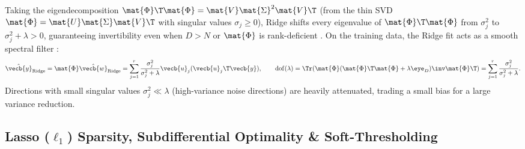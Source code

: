 \documentclass[../../../../master.tex]{subfiles}
\begin{document}
Taking the eigendecomposition $\mat{\Phi}\T\mat{\Phi} = \mat{V}\mat{\Sigma}^2\mat{V}\T$ (from the thin SVD $\mat{\Phi} = \mat{U}\mat{\Sigma}\mat{V}\T$ with singular values $\sigma_j \ge 0$), Ridge shifts every eigenvalue of $\mat{\Phi}\T\mat{\Phi}$ from $\sigma_j^2$ to $\sigma_j^2 + \lambda > 0$, guaranteeing invertibility even when $D > N$ or $\mat{\Phi}$ is rank-deficient . On the training data, the Ridge fit acts as a smooth spectral filter :
\begin{equation}
\label{eq:glm:ridge_svd}
\hat{\vecb{y}}_{\mathrm{Ridge}} = \mat{\Phi}\hat{\vecb{w}}_{\mathrm{Ridge}} = \sum_{j=1}^{r} \frac{\sigma_j^2}{\sigma_j^2 + \lambda}\vecb{u}_j(\vecb{u}_j\T\vecb{y}), \qquad
\mathrm{dof}(\lambda) = \Tr\!\left(\mat{\Phi}(\mat{\Phi}\T\mat{\Phi}+\lambda\eye_D)\inv\mat{\Phi}\T\right) = \sum_{j=1}^r \frac{\sigma_j^2}{\sigma_j^2 + \lambda}.
\end{equation}
Directions with small singular values $\sigma_j^2 \ll \lambda$ (high-variance noise directions) are heavily attenuated, trading a small bias for a large variance reduction.

\subsection{Lasso ($\ell_1$) Sparsity, Subdifferential Optimality \& Soft-Thresholding}
\label{subsec:glm:lasso}
\end{document}
